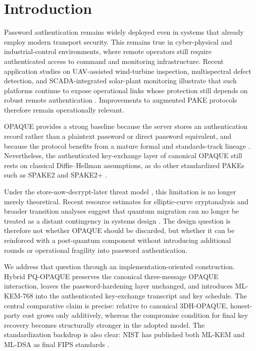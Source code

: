 \documentclass[conference]{IEEEtran}
\begin{document}
\section{Introduction}

Password authentication remains widely deployed even in systems that already employ modern transport security. This remains true in cyber-physical and industrial-control environments, where remote operators still require authenticated access to command and monitoring infrastructure. Recent application studies on UAV-assisted wind-turbine inspection, multispectral defect detection, and SCADA-integrated solar-plant monitoring illustrate that such platforms continue to expose operational links whose protection still depends on robust remote authentication \cite{en18071823,Svystun_Melnychenko_Radiuk_Savenko_Sachenko_Lysyi_2024,reksreks.2025.2.06}. Improvements to augmented PAKE protocols therefore remain operationally relevant.

OPAQUE provides a strong baseline because the server stores an authentication record rather than a plaintext password or direct password equivalent, and because the protocol benefits from a mature formal and standards-track lineage \cite{jarecki2018,ietf-opaque}. Nevertheless, the authenticated key-exchange layer of canonical OPAQUE still rests on classical Diffie--Hellman assumptions, as do other standardized PAKEs such as SPAKE2 and SPAKE2+ \cite{ladd2023,spake2plus2023}.

Under the store-now-decrypt-later threat model \cite{mosca2018}, this limitation is no longer merely theoretical. Recent resource estimates for elliptic-curve cryptanalysis and broader transition analyses suggest that quantum migration can no longer be treated as a distant contingency in systems design \cite{shor1994,bernstein2017,roetteler2017,babbush2026}. The design question is therefore not whether OPAQUE should be discarded, but whether it can be reinforced with a post-quantum component without introducing additional rounds or operational fragility into password authentication.

We address that question through an implementation-oriented construction. Hybrid PQ-OPAQUE preserves the canonical three-message OPAQUE interaction, leaves the password-hardening layer unchanged, and introduces ML-KEM-768 into the authenticated key-exchange transcript and key schedule. The central comparative claim is precise: relative to canonical 3DH-OPAQUE, honest-party cost grows only additively, whereas the compromise condition for final key recovery becomes structurally stronger in the adopted model. The standardization backdrop is also clear: NIST has published both ML-KEM and ML-DSA as final FIPS standards \cite{fips203,fips204}.
\end{document}
